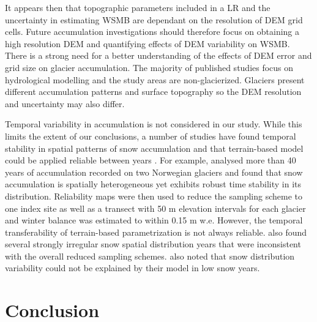 \documentclass[review,oneside, letterpaper]{igs}
\begin{document}
It appears then that topographic parameters included in a LR and the uncertainty in estimating WSMB are dependant on the resolution of DEM grid cells. Future accumulation investigations should therefore focus on obtaining a high resolution DEM and quantifying effects of DEM variability on WSMB. There is a strong need for a better understanding of the effects of DEM error and grid size on glacier accumulation. The majority of published studies focus on hydrological modelling and the study areas are non-glacierized. Glaciers present different accumulation patterns and surface topography so the DEM resolution and uncertainty may also differ.

Temporal variability in accumulation is not considered in our study. While this limits the extent of our conclusions, a number of studies have found temporal stability in spatial patterns of snow accumulation and that terrain-based model could be applied reliable between years \citep[e.g.][]{Grunewald2013}. For example, \cite{Walmsley2015} analysed more than 40 years of accumulation recorded on two Norwegian glaciers and found that snow accumulation is spatially heterogeneous yet exhibits robust time stability in its distribution. Reliability maps were then used to reduce the sampling scheme to one index site as well as a transect with 50 m elevation intervals for each glacier and winter balance was estimated to within 0.15 m w.e. However, the temporal transferability of terrain-based parametrization is not always reliable. \cite{Walmsley2015} also found several strongly irregular snow spatial distribution years that were inconsistent with the overall reduced sampling schemes. \cite{Revuelto2014} also noted that snow distribution variability could not be explained by their model in low snow years.


\section{Conclusion}
\end{document}
